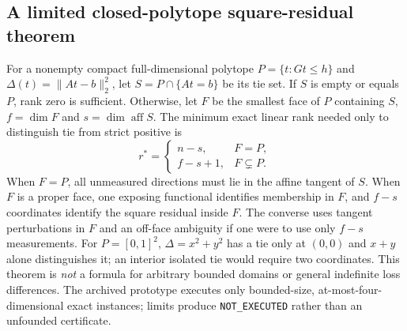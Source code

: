 \subsection{A limited closed-polytope square-residual theorem}
For a nonempty compact full-dimensional polytope $P=\{t:Gt\le h\}$ and $\Delta(t)=\|At-b\|_2^2$, let $S=P\cap\{At=b\}$ be its tie set. If $S$ is empty or equals $P$, rank zero is sufficient. Otherwise, let $F$ be the smallest face of $P$ containing $S$, $f=\dim F$ and $s=\dim\operatorname{aff} S$. The minimum exact linear rank needed only to distinguish tie from strict positive is
\begin{equation}
 r^*=\begin{cases}n-s,&F=P,\\ f-s+1,&F\subsetneq P.\end{cases}
\label{eq:polytope-s}
\end{equation}
When $F=P$, all unmeasured directions must lie in the affine tangent of $S$. When $F$ is a proper face, one exposing functional identifies membership in $F$, and $f-s$ coordinates identify the square residual inside $F$. The converse uses tangent perturbations in $F$ and an off-face ambiguity if one were to use only $f-s$ measurements. For $P=[0,1]^2$, $\Delta=x^2+y^2$ has a tie only at $(0,0)$ and $x+y$ alone distinguishes it; an interior isolated tie would require two coordinates. This theorem is \emph{not} a formula for arbitrary bounded domains or general indefinite loss differences. The archived prototype executes only bounded-size, at-most-four-dimensional exact instances; limits produce \texttt{NOT\_EXECUTED} rather than an unfounded certificate.

